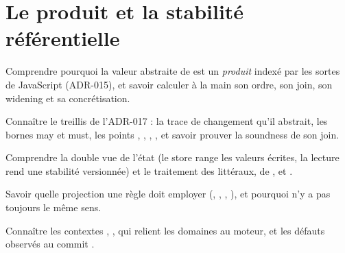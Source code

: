 \chapter{Le produit  et la stabilité référentielle}
\label{chap:statevalue-stabilite}

\begin{objectifs}
  \item Comprendre pourquoi la valeur abstraite de \reactant{} est un \emph{produit} indexé par les sortes de JavaScript (ADR-015), et savoir calculer à la main son ordre, son join, son widening et sa concrétisation.
  \item Connaître le treillis  de l'ADR-017 : la trace de changement qu'il abstrait, les bornes may et must, les points , , , , et savoir prouver la soundness de son join.
  \item Comprendre la double vue de l'état (le store range les valeurs écrites, la lecture rend une stabilité versionnée) et le traitement des littéraux, de ,  et .
  \item Savoir quelle projection une règle doit employer (, , , ), et pourquoi  n'y a pas toujours le même sens.
  \item Connaître les contextes , ,  qui relient les domaines au moteur, et les défauts observés au commit \snapshotCommit.
\end{objectifs}



